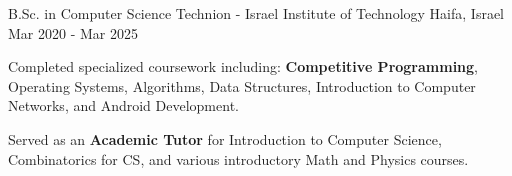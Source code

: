 

\begin{cventries}

  \cventry
    {B.Sc. in Computer Science} %
    {Technion - Israel Institute of Technology} %
    {Haifa, Israel} %
    {Mar 2020 - Mar 2025} %
    {
      \begin{cvitems} %
        \item {Completed specialized coursework including: \textbf{Competitive Programming}, Operating Systems, Algorithms, Data Structures, Introduction to Computer Networks, and Android Development.}
        \item {Served as an \textbf{Academic Tutor} for Introduction to Computer Science, Combinatorics for CS, and various introductory Math and Physics courses.}
      \end{cvitems}
    }

\end{cventries}